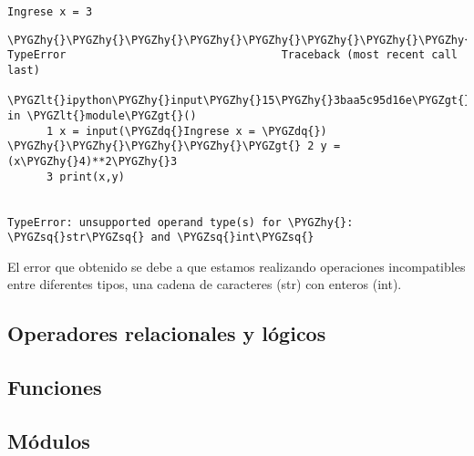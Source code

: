 \documentclass[a4paper,12pt,spanish]{sphinxmanual}
\def\PYGZlt{\char`\<}
\def\PYGZgt{\char`\>}
\def\PYGZhy{\char`\-}
\def\PYGZsq{\char`\'}
\def\PYGZdq{\char`\"}
\renewcommand\PYGZsq{\textquotesingle}
\begin{document}
\begin{Verbatim}[commandchars=\\\{\}]
Ingrese x = 3
\end{Verbatim}

\begin{Verbatim}[commandchars=\\\{\}]
\PYGZhy{}\PYGZhy{}\PYGZhy{}\PYGZhy{}\PYGZhy{}\PYGZhy{}\PYGZhy{}\PYGZhy{}\PYGZhy{}\PYGZhy{}\PYGZhy{}\PYGZhy{}\PYGZhy{}\PYGZhy{}\PYGZhy{}\PYGZhy{}\PYGZhy{}\PYGZhy{}\PYGZhy{}\PYGZhy{}\PYGZhy{}\PYGZhy{}\PYGZhy{}\PYGZhy{}\PYGZhy{}\PYGZhy{}\PYGZhy{}\PYGZhy{}\PYGZhy{}\PYGZhy{}\PYGZhy{}\PYGZhy{}\PYGZhy{}\PYGZhy{}\PYGZhy{}\PYGZhy{}\PYGZhy{}\PYGZhy{}\PYGZhy{}\PYGZhy{}\PYGZhy{}\PYGZhy{}\PYGZhy{}\PYGZhy{}\PYGZhy{}\PYGZhy{}\PYGZhy{}\PYGZhy{}\PYGZhy{}\PYGZhy{}\PYGZhy{}\PYGZhy{}\PYGZhy{}\PYGZhy{}\PYGZhy{}\PYGZhy{}\PYGZhy{}\PYGZhy{}\PYGZhy{}\PYGZhy{}\PYGZhy{}\PYGZhy{}\PYGZhy{}\PYGZhy{}\PYGZhy{}\PYGZhy{}\PYGZhy{}\PYGZhy{}\PYGZhy{}\PYGZhy{}\PYGZhy{}\PYGZhy{}\PYGZhy{}\PYGZhy{}\PYGZhy{}
TypeError                                 Traceback (most recent call last)

\PYGZlt{}ipython\PYGZhy{}input\PYGZhy{}15\PYGZhy{}3baa5c95d16e\PYGZgt{} in \PYGZlt{}module\PYGZgt{}()
      1 x = input(\PYGZdq{}Ingrese x = \PYGZdq{})
\PYGZhy{}\PYGZhy{}\PYGZhy{}\PYGZhy{}\PYGZgt{} 2 y = (x\PYGZhy{}4)**2\PYGZhy{}3
      3 print(x,y)


TypeError: unsupported operand type(s) for \PYGZhy{}: \PYGZsq{}str\PYGZsq{} and \PYGZsq{}int\PYGZsq{}
\end{Verbatim}

El error que obtenido se debe a que estamos realizando operaciones
incompatibles entre diferentes tipos, una cadena de caracteres (str) con
enteros (int).


\subsection{Operadores relacionales y lógicos}
\label{Unidad01:operadores-relacionales-y-logicos}

\subsection{Funciones}
\label{Unidad01:funciones}

\subsection{Módulos}
\label{Unidad01:modulos}
\end{document}
